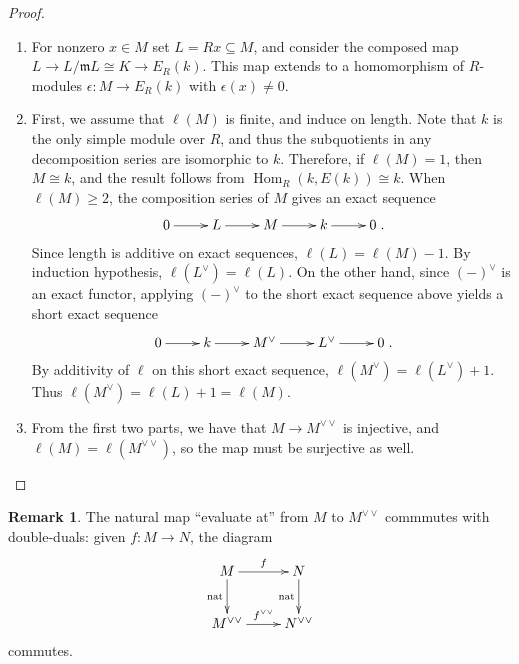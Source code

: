 \documentclass[11pt]{book}
\newtheorem{corollary}[theorem]{Corollary}
\numberwithin{equation}{section}
\numberwithin{theorem}{chapter}
\theoremstyle{definition}
\newtheorem*{basic properties}{Basic Properties}
\newtheorem*{Important Remark}{Important Remark}
\newtheorem{remark}[theorem]{Remark}
\theoremstyle{remark}
\newcommand{\m}{\mathfrak{m}}
\newcommand{\Hom}{\operatorname{Hom}}
\begin{document}
\begin{proof}
	\begin{enumerate}
		\item For nonzero $x\in M$ set $L = Rx \subseteq M$, and consider the composed
		map $L\to L/\m L \cong K \to E_R(k)$. This map extends to a homomorphism
		of $R$-modules $\epsilon: M \to E_R(k)$ with $\epsilon (x) \neq 0$.

\item	First, we assume that $\ell(M)$ is finite, and induce on length. Note that $k$ is the only simple module over $R$, and thus the subquotients in any decomposition series are isomorphic to $k$. Therefore, if $\ell(M)=1$, then $M \cong k$, and the result follows from $\Hom_R(k, E(k)) \cong k$. When $\ell(M) \geqslant 2$, the composition series of $M$ gives an exact sequence
	$$\xymatrix{0 \ar[r] & L \ar[r] & M \ar[r] & k \ar[r] & 0}.$$
	Since length is additive on exact sequences, $\ell(L) = \ell(M)-1$. By induction hypothesis, $\ell(L^\vee) = \ell(L)$. On the other hand, since $(-)^{\vee}$ is an exact functor, applying $(-)^{\vee}$ to the short exact sequence above yields a short exact sequence
	$$\xymatrix{0 \ar[r] & k \ar[r] & M^\vee \ar[r] & L^\vee \ar[r] & 0}.$$
	By additivity of $\ell$ on this short exact sequence, $\ell(M^\vee) = \ell(L^\vee) + 1$. Thus $\ell(M^\vee) = \ell(L) + 1 = \ell(M)$.
	
	\item From the first two parts, we have that $M\to M^{\vee\vee}$ is injective, and $\ell(M)=\ell(M^{\vee\vee})$, so the map must be surjective as well.
		\end{enumerate}
\end{proof}

\begin{remark}
	The natural map ``evaluate at'' from $M$ to $M^{\vee\vee}$ commmutes with double-duals: given $f\colon M \to N$, the diagram
		$$\xymatrix{M \ar[d]_-{\mathrm{nat}} \ar[r]^-{f} & N \ar[d]_-{\mathrm{nat}} \\
		M^{\vee \vee} \ar[r]^-{f^{\vee \vee}} & N^{\vee \vee} }$$
	commutes.
\end{remark}

%
\end{document}
